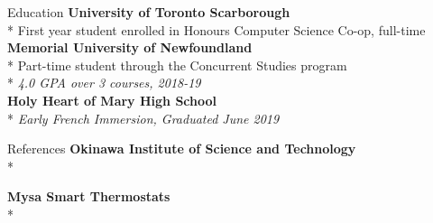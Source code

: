 \documentclass[11pt, letterpaper]{article}
\begin{document}
\begin{section}{Education}
\textbf{University of Toronto Scarborough}\\*
First year student enrolled in Honours Computer Science Co-op, full-time\\

\textbf{Memorial University of Newfoundland}\\*
Part-time student through the Concurrent Studies program\\*
\textit{4.0 GPA over 3 courses, 2018-19}\\

\textbf{Holy Heart of Mary High School}\\*
\textit{Early French Immersion, Graduated June 2019}
\end{section}

\begin{section}{References}
\textbf{Okinawa Institute of Science and Technology}\\*

\textbf{Mysa Smart Thermostats}\\*


\end{section}
\end{document}
